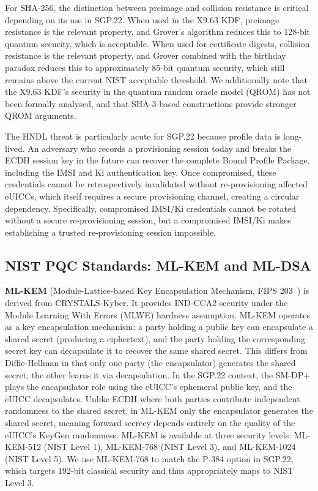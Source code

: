 \documentclass[a4paper,fleqn]{cas-sc}
\begin{document}
For SHA-256, the distinction between preimage and collision resistance is critical
depending on its use in SGP.22. When used in the X9.63 KDF, preimage resistance
is the relevant property, and Grover's algorithm reduces this to 128-bit quantum
security, which is acceptable. When used for certificate digests, collision
resistance is the relevant property, and Grover combined with the birthday paradox
reduces this to approximately 85-bit quantum security, which still remains above
the current NIST acceptable threshold. We additionally note that the X9.63 KDF's
security in the quantum random oracle model (QROM) has not been formally analysed,
and that SHA-3-based constructions provide stronger QROM arguments.

The HNDL threat is particularly acute for SGP.22 because profile data is
long-lived. An adversary who records a provisioning session today and
breaks the ECDH session key in the future can recover the complete Bound
Profile Package, including the IMSI and Ki authentication key. Once
compromised, these credentials cannot be retrospectively invalidated
without re-provisioning affected eUICCs, which itself requires a secure
provisioning channel, creating a circular dependency. Specifically,
compromised IMSI/Ki credentials cannot be rotated without a secure
re-provisioning session, but a compromised IMSI/Ki makes establishing a
trusted re-provisioning session impossible.

\subsection{NIST PQC Standards: ML-KEM and ML-DSA}
\label{sec:bg-pqc}

\textbf{ML-KEM} (Module-Lattice-based Key Encapsulation Mechanism,
FIPS 203~\cite{nist_fips203}) is derived from CRYSTALS-Kyber. It
provides IND-CCA2 security under the Module Learning With Errors (MLWE)
hardness assumption. ML-KEM operates as a key encapsulation mechanism:
a party holding a public key can encapsulate a shared secret (producing a
ciphertext), and the party holding the corresponding secret key can
decapsulate it to recover the same shared secret. This differs from
Diffie-Hellman in that only one party (the encapsulator) generates the
shared secret; the other learns it via decapsulation. In the SGP.22
context, the SM-DP+ plays the encapsulator role using the eUICC's
ephemeral public key, and the eUICC decapsulates. Unlike ECDH where both parties
contribute independent randomness to the shared secret, in ML-KEM only the encapsulator
generates the shared secret, meaning forward secrecy depends entirely on the
quality of the eUICC's KeyGen randomness. ML-KEM is available at
three security levels: ML-KEM-512 (NIST Level 1), ML-KEM-768 (NIST
Level 3), and ML-KEM-1024 (NIST Level 5). We use ML-KEM-768 to match
the P-384 option in SGP.22, which targets 192-bit classical security and
thus appropriately maps to NIST Level 3.
\end{document}
